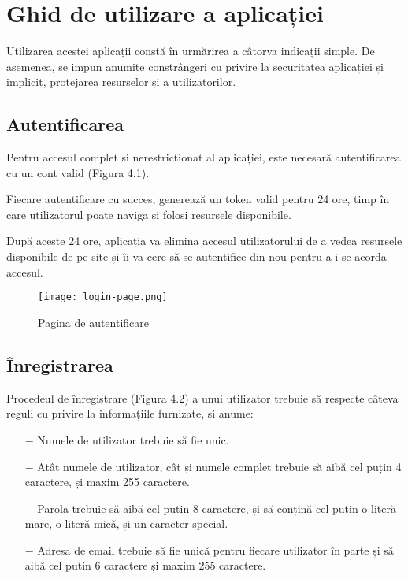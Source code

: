 \chapter{Ghid de utilizare a aplicației}

Utilizarea acestei aplicații constă în urmărirea a câtorva indicații simple. De asemenea, se impun anumite constrângeri cu privire la securitatea aplicației și implicit, protejarea resurselor și a utilizatorilor.\newline

\section{Autentificarea}

Pentru accesul complet si nerestricționat al aplicației, este necesară autentificarea cu un cont valid (Figura 4.1).\newline

Fiecare autentificare cu succes, generează un token valid pentru 24 ore, timp în care utilizatorul poate naviga și folosi resursele disponibile.\newline

După aceste 24 ore, aplicația va elimina accesul utilizatorului de a vedea resursele disponibile de pe site și îi va cere să se autentifice din nou pentru a i se acorda accesul.\newline

\begin{figure}[H]
	\begin{center}
		\texttt{[image: login-page.png]}
		\caption{Pagina de autentificare}
	\end{center}
\end{figure}
\bigskip

\section{Înregistrarea}

Procedeul de înregistrare (Figura 4.2) a unui utilizator trebuie să respecte câteva reguli cu privire la informațiile furnizate, și anume:
\begin{itemize}
	\addtolength{\itemindent}{1cm}
	\item[$-$]Numele de utilizator trebuie să fie unic.
	\item[$-$]Atât numele de utilizator, cât și numele complet trebuie să aibă cel puțin 4 caractere, și maxim 255 caractere.
	\item[$-$]Parola trebuie să aibă cel putin 8 caractere, și să conțină cel puțin o literă mare, o literă mică, și un caracter special.
	\item[$-$]Adresa de email trebuie să fie unică pentru fiecare utilizator în parte și să aibă cel puțin 6 caractere și maxim 255 caractere.
	\newline
\end{itemize}

